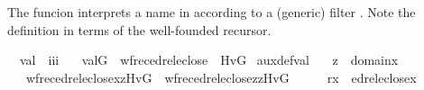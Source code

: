 \begin{isabellebody}
\begin{isamarkuptext}%
The funcion  interprets a name in 
according to a (generic) filter . Note the definition
in terms of the well-founded recursor.%
\end{isamarkuptext}\isamarkuptrue%
\isamarkupfalse%
\isanewline
\ \ val\ {\isacharcolon}{\kern0pt}{\isacharcolon}{\kern0pt}\ {\isachardoublequoteopen}i{\isasymRightarrow}i{\isasymRightarrow}i{\isachardoublequoteclose}\ \isanewline
\ \ {\isachardoublequoteopen}val{\isacharparenleft}{\kern0pt}G{\isacharcomma}{\kern0pt}{\isasymtau}{\isacharparenright}{\kern0pt}\ {\isasymequiv}\ wfrec{\isacharparenleft}{\kern0pt}edrel{\isacharparenleft}{\kern0pt}eclose{\isacharparenleft}{\kern0pt}{\isacharbraceleft}{\kern0pt}{\isasymtau}{\isacharbraceright}{\kern0pt}{\isacharparenright}{\kern0pt}{\isacharparenright}{\kern0pt}{\isacharcomma}{\kern0pt}\ {\isasymtau}\ {\isacharcomma}{\kern0pt}Hv{\isacharparenleft}{\kern0pt}G{\isacharparenright}{\kern0pt}{\isacharparenright}{\kern0pt}{\isachardoublequoteclose}\isanewline
\isanewline
{}\isamarkupfalse%
\ aux{\isacharunderscore}{\kern0pt}def{\isacharunderscore}{\kern0pt}val{\isacharcolon}{\kern0pt}\isanewline
\ \ \ {\isachardoublequoteopen}z\ {\isasymin}\ domain{\isacharparenleft}{\kern0pt}x{\isacharparenright}{\kern0pt}{\isachardoublequoteclose}\isanewline
\ \ \ {\isachardoublequoteopen}wfrec{\isacharparenleft}{\kern0pt}edrel{\isacharparenleft}{\kern0pt}eclose{\isacharparenleft}{\kern0pt}{\isacharbraceleft}{\kern0pt}x{\isacharbraceright}{\kern0pt}{\isacharparenright}{\kern0pt}{\isacharparenright}{\kern0pt}{\isacharcomma}{\kern0pt}z{\isacharcomma}{\kern0pt}Hv{\isacharparenleft}{\kern0pt}G{\isacharparenright}{\kern0pt}{\isacharparenright}{\kern0pt}\ {\isacharequal}{\kern0pt}\ wfrec{\isacharparenleft}{\kern0pt}edrel{\isacharparenleft}{\kern0pt}eclose{\isacharparenleft}{\kern0pt}{\isacharbraceleft}{\kern0pt}z{\isacharbraceright}{\kern0pt}{\isacharparenright}{\kern0pt}{\isacharparenright}{\kern0pt}{\isacharcomma}{\kern0pt}z{\isacharcomma}{\kern0pt}Hv{\isacharparenleft}{\kern0pt}G{\isacharparenright}{\kern0pt}{\isacharparenright}{\kern0pt}{\isachardoublequoteclose}\isanewline
%
\isadelimproof
%
\endisadelimproof
%
\isatagproof
{}\isamarkupfalse%
\ {\isacharminus}{\kern0pt}\isanewline
\ \ \isamarkupfalse%
\ {\isacharquery}{\kern0pt}r{\isacharequal}{\kern0pt}{\isachardoublequoteopen}{\isasymlambda}x\ {\isachardot}{\kern0pt}\ edrel{\isacharparenleft}{\kern0pt}eclose{\isacharparenleft}{\kern0pt}{\isacharbraceleft}{\kern0pt}x{\isacharbraceright}{\kern0pt}{\isacharparenright}{\kern0pt}{\isacharparenright}{\kern0pt}{\isachardoublequoteclose}\isanewline

\end{isabellebody}
